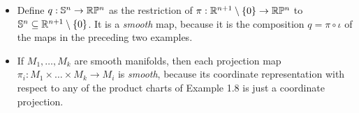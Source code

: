 \documentclass[11pt]{article}
\begin{document}
\begin{itemize}
\item \begin{example}
Define $q: {\mathbb S}^n \rightarrow {\mathbb R}{\mathbb P}^n$ as the restriction of $\pi: {\mathbb R}^{n+1} \setminus \left\{0\right\} \rightarrow {\mathbb R}{\mathbb P}^n$ to ${\mathbb S}^n \subseteq  {\mathbb R}^{n+1} \setminus \left\{0\right\}$. It is a \emph{smooth} map, because it is the composition $q = \pi \circ \iota$ of the maps in the preceding two examples.
\end{example}

\item \begin{example}
If $M_1 ,\ldots, M_k$ are smooth manifolds, then each projection map $\pi_i: M_1 \times \ldots \times M_k \rightarrow M_i$ is \emph{smooth}, because its coordinate representation with respect to any of the product charts of Example 1.8 is just a coordinate projection.
\end{example}

\end{itemize}
\end{document}
